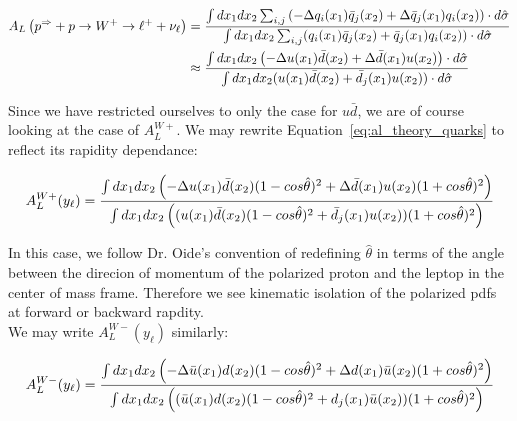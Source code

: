 \begin{align}\label{eq:al_theory_quarks}
  {
    A_L
    \left(
      p^{\Rightarrow}+p\rightarrow W^+ \rightarrow \ell^+ +\nu_{\ell}
    \right)
  } &=  
  {
    {
      \int dx_1 dx_2 \sum_{i,j}
      \left(
        -\Delta q_i(x_1)\bar{q}_j(x_2)
        +\Delta \bar{q}_j(x_1)q_i(x_2)
      \right)\cdot d \hat{\sigma}
    }
    \over
    {
      \int dx_1 dx_2
      \sum_{i,j}(q_i(x_1)\bar{q}_j(x_2)+\bar{q}_j(x_1)q_i(x_2))\cdot d\hat{\sigma}
    }
 }\\
 & \approx  \nonumber
 {
   {
      \int dx_1 dx_2 
      \left(
        -\Delta u(x_1)\bar{d}(x_2)
        +\Delta \bar{d}(x_1)u(x_2)
      \right)\cdot d \hat{\sigma}
   }
   \over
   {
      \int dx_1 dx_2 (u(x_1)\bar{d}(x_2)+\bar{d}_j(x_1)u(x_2))\cdot d\hat{\sigma}
   }
 }
\end{align}

Since we have restricted ourselves to only the case for $u\bar{d}$, we are of
course looking at the case of $A_L^{W+}$. We may rewrite
Equation~\ref{eq:al_theory_quarks} to reflect its rapidity dependance:

\begin{equation}
  {A_L^{W+}(y_{\ell})} = 
  {
    {
     \int dx_1 dx_2 
     \left(
       -\Delta u(x_1)\bar{d}(x_2)(1-cos\hat{\theta})^2
       +\Delta \bar{d}(x_1)u(x_2)(1+cos\hat{\theta})^2
     \right)
    }
    \over
    {
       \int dx_1 dx_2 
       \left(
       (u(x_1)\bar{d}(x_2)   (1-cos\hat{\theta})^2
      +\bar{d}_j(x_1)u(x_2)) (1+cos\hat{\theta})^2
        \right)
    }
  }
  \label{eq:al_w_pos_rapidity_dependance}
\end{equation}

In this case, we follow Dr. Oide's convention of redefining $\hat{\theta}$ in
terms of the angle between the direcion of momentum of the polarized proton and
the leptop in the center of mass frame. Therefore we see kinematic isolation of
the polarized pdfs at forward or backward rapdity.\\

{\noindent}We may write $A_L^{W-}(y_{\ell})$ similarly:

\begin{equation}
  {A_L^{W-}(y_{\ell})} = 
  {
    {
     \int dx_1 dx_2 
     \left(
       -\Delta \bar{u}(x_1)d(x_2)(1-cos\hat{\theta})^2
       +\Delta d(x_1)\bar{u}(x_2)(1+cos\hat{\theta})^2
     \right)
    }
    \over
    {
       \int dx_1 dx_2 
       \left(
         (\bar{u}(x_1)d(x_2)   (1-cos\hat{\theta})^2
         +d_j(x_1)\bar{u}(x_2)) (1+cos\hat{\theta})^2
        \right)
    }
  }
  \label{eq:al_w_neg_rapidity_dependance}
\end{equation}
\clearpage
